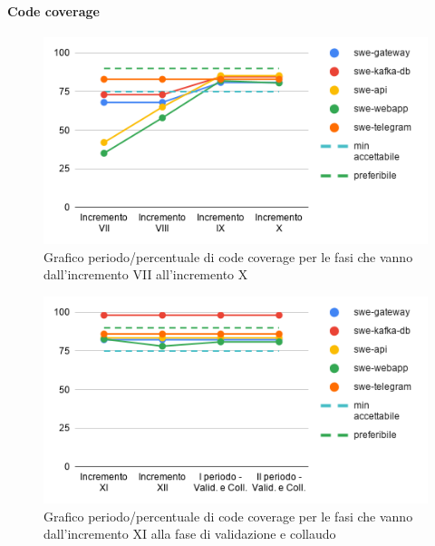 \paragraph{Code coverage}
\begin{figure}[H]
			\centering
			\includegraphics[width=0.8\linewidth]{./res/images/QM-TEST-1-COCO.png}
			\caption{Grafico periodo/percentuale di code coverage per le fasi che vanno dall'incremento VII all'incremento X}
			\label{fig:Grafico periodo/percentuale di code coverage per le fasi che vanno dall'incremento VII all'incremento X}
	\end{figure}
	\begin{figure}[H]
			\centering
			\includegraphics[width=0.8\linewidth]{./res/images/QM-TEST-1-COCO_1.png}
			\caption{Grafico periodo/percentuale di code coverage per le fasi che vanno dall'incremento XI alla fase di validazione e collaudo}
			\label{fig:Grafico periodo/percentuale di code coverage per le fasi che vanno dall'incremento XI alla fase di validazione e collaudo}
	\end{figure}

